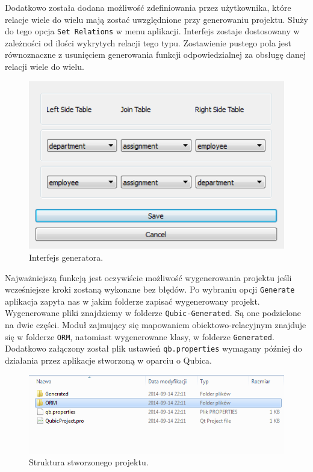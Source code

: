 \documentclass[12pt]{report}
\begin{document}
{Dodatkowo została dodana możliwość zdefiniowania przez użytkownika, które relacje wiele do wielu mają zostać uwzględnione przy generowaniu projektu. Służy do tego opcja {\tt Set Relations} w menu aplikacji. Interfejs zostaje dostosowany w zależności od ilości wykrytych relacji tego typu. Zostawienie pustego pola jest równoznaczne z usunięciem generowania funkcji odpowiedzialnej za obsługę danej relacji wiele do wielu.

\begin{figure}[h]
	\centering
	\includegraphics[width=1\textwidth]{images/qubic-rel.png}
	\caption{Interfejs generatora.}
\end{figure}
\FloatBarrier	

Najważniejszą funkcją jest oczywiście możliwość wygenerowania projektu jeśli wcześniejsze kroki zostaną wykonane bez błędów. Po wybraniu opcji {\tt Generate} aplikacja zapyta nas w jakim folderze zapisać wygenerowany projekt. Wygenerowane pliki znajdziemy w folderze {\tt Qubic-Generated}. Są one podzielone na dwie części. Moduł zajmujący się mapowaniem obiektowo-relacyjnym znajduje się w folderze {\tt ORM}, natomiast wygenerowane klasy, w folderze {\tt Generated}. Dodatkowo załączony został plik ustawień {\tt qb.properties} wymagany później do działania przez aplikacje stworzoną w oparciu o Qubica. 

\begin{figure}[h]
	\centering
	\includegraphics[width=1\textwidth]{images/qubic-out.png}
	\caption{Struktura stworzonego projektu.}
\end{figure}
\FloatBarrier	

}
\end{document}
